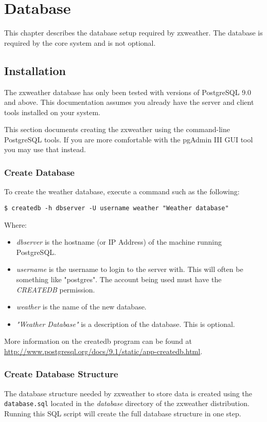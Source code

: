 \documentclass[a4paper,10pt,draft]{book}
\begin{document}
\chapter{Database}
\label{cha_database}

This chapter describes the database setup required by zxweather. The database is required by the core system and is not optional.

\section{Installation}
The zxweather database has only been tested with versions of PostgreSQL 9.0 and above. This documentation assumes you already have the server and client tools installed on your system.

This section documents creating the zxweather using the command-line PostgreSQL tools. If you are more comfortable with the pgAdmin III GUI tool you may use that instead.

\subsection{Create Database}
To create the weather database, execute a command such as the following:

\begin{verbatim}
$ createdb -h dbserver -U username weather "Weather database"
\end{verbatim}

Where:
\begin{itemize}
\item \emph{dbserver} is the hostname (or IP Address) of the machine running PostgreSQL.
\item \emph{username} is the username to login to the server with. This will often be something like "postgres". The account being used must have the \emph{CREATEDB} permission.
\item \emph{weather} is the name of the new database.
\item \emph{"Weather Database"} is a description of the database. This is optional.
\end{itemize}

More information on the createdb program can be found at \url{http://www.postgresql.org/docs/9.1/static/app-createdb.html}.

\subsection{Create Database Structure}
The database structure needed by zxweather to store data is created using the \verb|database.sql| located in the \emph{database} directory of the zxweather distribution. Running this SQL script will create the full database structure in one step.
\end{document}

